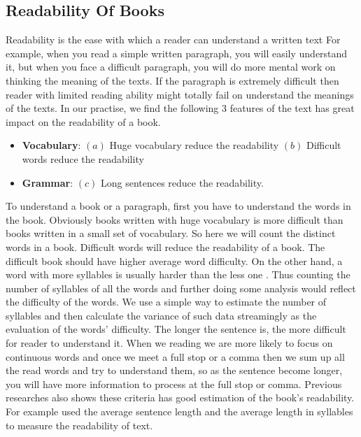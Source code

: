 \documentclass{article}
\begin{document}
\subsection{Readability Of Books}
Readability is the ease with which a reader can understand a written text \cite{readability} For example, when you read a simple written paragraph, you will easily understand it, but when you face a difficult paragraph, you will do more mental work on thinking the meaning of the texts. If the paragraph is extremely difficult then reader with limited reading ability might totally fail on understand the meanings of the texts.
\newline\newline
In our practise, we find the following 3 features of the text has great impact on the readability of a book.
\begin{itemize}
	\item \textbf{Vocabulary}: 	$(a)$ Huge vocabulary reduce the readability \quad $(b)$ Difficult words reduce the readability
	\item \textbf{Grammar}: $(c)$ Long sentences reduce the readability. 
\end{itemize}
To understand a book or a paragraph, first you have to understand the words in the book. Obviously books written with huge vocabulary is more difficult than books written in a small set of vocabulary. So here we will count the distinct words in a book.
\newline
\newline
Difficult words will reduce the readability of a book. The difficult book should have higher average word difficulty. On the other hand, a word with more syllables is usually harder than the less one \cite{fry}. Thus counting the number of syllables of all the words and further doing some analysis would reflect the difficulty of the words. We use a simple way
to estimate the number of syllables and then calculate the variance of such data streamingly as the evaluation of the words' difficulty.
\newline
\newline
The longer the sentence is, the more difficult for reader to understand it. When we reading we are more likely to focus on continuous words and once we meet a full stop or a comma then we sum up all the read words and try to understand them, so as the sentence become longer, you will have more information to process at the full stop or comma.
\newline
\newline
Previous researches also shows these criteria has good estimation of the book's readability. For example \cite{chall}\cite{flesch}\cite{klare} used the average sentence length and the average length in syllables to measure the readability of text. 
\end{document}
